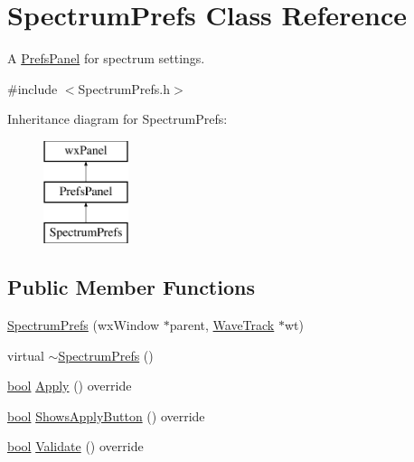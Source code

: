 \hypertarget{class_spectrum_prefs}{}\section{Spectrum\+Prefs Class Reference}
\label{class_spectrum_prefs}


A \hyperlink{class_prefs_panel}{Prefs\+Panel} for spectrum settings.  




{\ttfamily \#include $<$Spectrum\+Prefs.\+h$>$}

Inheritance diagram for Spectrum\+Prefs\+:\begin{figure}[H]
\begin{center}
\leavevmode
\includegraphics[height=3.000000cm]{class_spectrum_prefs}
\end{center}
\end{figure}
\subsection*{Public Member Functions}
\begin{DoxyCompactItemize}
\item 
\hyperlink{class_spectrum_prefs_a95d0aab8fff39df63f4dfed684326890}{Spectrum\+Prefs} (wx\+Window $\ast$parent, \hyperlink{class_wave_track}{Wave\+Track} $\ast$wt)
\item 
virtual \hyperlink{class_spectrum_prefs_a3bd11c63bd38dedf39c59ad6cda7f5e5}{$\sim$\+Spectrum\+Prefs} ()
\item 
\hyperlink{mac_2config_2i386_2lib-src_2libsoxr_2soxr-config_8h_abb452686968e48b67397da5f97445f5b}{bool} \hyperlink{class_spectrum_prefs_a0e6aae22faea6a2d2e902a1c64720575}{Apply} () override
\item 
\hyperlink{mac_2config_2i386_2lib-src_2libsoxr_2soxr-config_8h_abb452686968e48b67397da5f97445f5b}{bool} \hyperlink{class_spectrum_prefs_a3c0c527e962538c4e5a9c45466c5b14e}{Shows\+Apply\+Button} () override
\item 
\hyperlink{mac_2config_2i386_2lib-src_2libsoxr_2soxr-config_8h_abb452686968e48b67397da5f97445f5b}{bool} \hyperlink{class_spectrum_prefs_a9f53beb7f87ba1a06a0339bb19aeed05}{Validate} () override
\end{DoxyCompactItemize}


